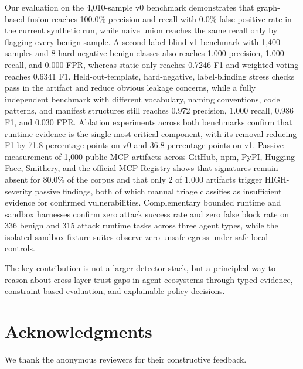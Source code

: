 \documentclass[10pt]{article}
\begin{document}
Our evaluation on the 4{,}010-sample v0 benchmark demonstrates that
graph-based fusion reaches 100.0\% precision and recall with 0.0\% false
positive rate in the current synthetic run, while naive union reaches the same
recall only by flagging every benign sample. A second label-blind v1 benchmark
with 1{,}400 samples and 8 hard-negative benign classes also reaches 1.000
precision, 1.000 recall, and 0.000 FPR, whereas static-only reaches 0.7246 F1
and weighted voting reaches 0.6341 F1. Held-out-template, hard-negative,
label-blinding stress checks pass in the artifact and reduce obvious leakage
concerns, while a fully independent benchmark with different vocabulary, naming
conventions, code patterns, and manifest structures still reaches 0.972
precision, 1.000 recall, 0.986 F1, and 0.030 FPR. Ablation experiments across
both benchmarks confirm that runtime evidence is the single most critical
component, with its removal reducing F1 by 71.8 percentage points on v0 and
36.8 percentage points on v1. Passive measurement of 1{,}000 public MCP
artifacts across GitHub, npm, PyPI, Hugging Face, Smithery, and the official
MCP Registry shows that signatures remain absent for 80.0\% of the corpus and
that only 2 of 1{,}000 artifacts trigger HIGH-severity passive findings, both
of which manual triage classifies as insufficient evidence for confirmed
vulnerabilities. Complementary bounded runtime and sandbox harnesses confirm
zero attack success rate and zero false block rate on 336 benign and 315 attack
runtime tasks across three agent types, while the isolated sandbox fixture
suites observe zero unsafe egress under safe local controls.

The key contribution is not a larger detector stack, but a principled way to reason about cross-layer trust gaps in agent ecosystems through typed evidence, constraint-based evaluation, and explainable policy decisions.

\section*{Acknowledgments}

We thank the anonymous reviewers for their constructive feedback.




\clearpage

\end{document}
